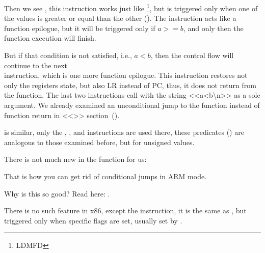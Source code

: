 
Then we see , this instruction works just like \footnote{\ac{LDMFD}},
but is triggered only when one of the values is greater or equal than the other ().
The  instruction acts like a function epilogue, but it will be triggered only if $a>=b$, and only then the function execution will finish.


But if that condition is not satisfied, i.e., $a<b$, then the control flow will continue to the next \\
 instruction, which is one more function epilogue. This instruction restores not only the  registers state, but also \ac{LR} instead of \ac{PC}, thus, it does not return from the function.
The last two instructions call \printf with the string <<a<b\textbackslash{}n>> as a sole argument.
We already examined an unconditional jump to the \printf function instead of function return in <<\PrintfSeveralArgumentsSectionName>> section~().

 is similar, only the , , and  instructions are used there, these predicates () are analogous to those examined before, but for unsigned values.

There is not much new in the \main function for us:



That is how you can get rid of conditional jumps in ARM mode.

Why is this so good? Read here: .


There is no such feature in x86, except the  instruction, it is the same as \MOV,
but triggered only when specific flags are set, usually set by \CMP.

\mysubparagraph{\OptimizingKeilVI (\ThumbMode)}



